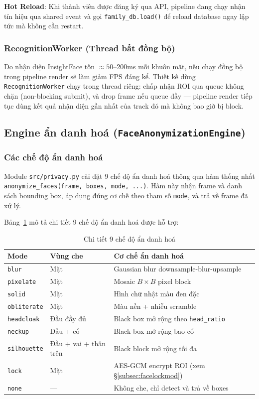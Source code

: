 \medskip
\textbf{Hot Reload}: Khi thành viên được đăng ký qua API, pipeline đang chạy nhận tín hiệu qua shared event và gọi \texttt{family\_db.load()} để reload database ngay lập tức mà không cần restart.

\subsubsection{RecognitionWorker (Thread bất đồng bộ)}
\label{subsubsec:recworker}

Do nhận diện InsightFace tốn $\approx 50$--$200$ms mỗi khuôn mặt, nếu chạy đồng bộ trong pipeline render sẽ làm giảm FPS đáng kể. Thiết kế dùng \texttt{RecognitionWorker} chạy trong thread riêng: chấp nhận ROI qua queue không chặn (non-blocking submit), và drop frame nếu queue đầy --- pipeline render tiếp tục dùng kết quả nhận diện gần nhất của track đó mà không bao giờ bị block.

\subsection{Engine ẩn danh hoá (\texttt{FaceAnonymizationEngine})}
\label{subsec:anonymizermod}

\subsubsection{Các chế độ ẩn danh hoá}
\label{subsubsec:modes}

Module \texttt{src/privacy.py} cài đặt 9 chế độ ẩn danh hoá thông qua hàm thống nhất \texttt{anonymize\_faces(frame, boxes, mode, ...)}. Hàm này nhận frame và danh sách bounding box, áp dụng đúng cơ chế theo tham số \texttt{mode}, và trả về frame đã xử lý.

\medskip
Bảng~\ref{tab:modes} mô tả chi tiết 9 chế độ ẩn danh hoá được hỗ trợ:

\begin{table}[H]
\centering
\caption{Chi tiết 9 chế độ ẩn danh hoá}
\label{tab:modes}
\begin{tabular}{|l|l|p{}|}
\hline
\textbf{Mode} & \textbf{Vùng che} & \textbf{Cơ chế ẩn danh hoá} \\
\hline
\texttt{blur} & Mặt & Gaussian blur downsample-blur-upsample \\
\texttt{pixelate} & Mặt & Mosaic $B \times B$ pixel block \\
\texttt{solid} & Mặt & Hình chữ nhật màu đen đặc \\
\texttt{obliterate} & Mặt & Màu nền + nhiễu scramble \\
\texttt{headcloak} & Đầu đầy đủ & Black box mở rộng theo \texttt{head\_ratio} \\
\texttt{neckup} & Đầu + cổ & Black box mở rộng bao cổ \\
\texttt{silhouette} & Đầu + vai + thân trên & Black block mở rộng tối đa \\
\texttt{lock} & Mặt & AES-GCM encrypt ROI (xem §\ref{subsec:facelockmod}) \\
\texttt{none} & --- & Không che, chỉ detect và trả về boxes \\
\hline
\end{tabular}
\end{table}

